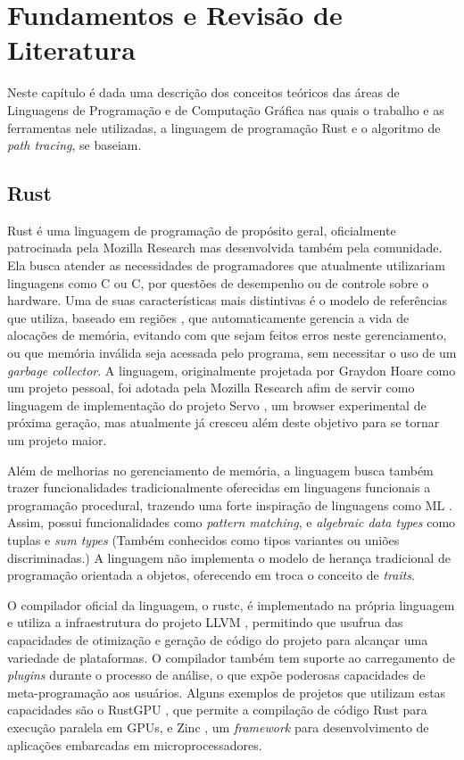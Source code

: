 \documentclass[tg]{mdtufsm}
\def\Cpp{{C\nolinebreak[4]\raisebox{.20ex}{\small\bf++}}}
\begin{document}
\chapter{Fundamentos e Revisão de Literatura}

Neste capítulo é dada uma descrição dos conceitos teóricos das áreas de Linguagens de Programação e de Computação Gráfica nas quais o trabalho e as ferramentas nele utilizadas, a linguagem de programação Rust e o algoritmo de \emph{path tracing}, se baseiam.

\section{Rust}

Rust \citep{rust} é uma linguagem de programação de propósito geral, oficialmente patrocinada pela
Mozilla Research mas desenvolvida também pela comunidade. Ela busca atender as necessidades
de programadores que atualmente utilizariam linguagens como C ou
\Cpp, por questões de desempenho ou de controle sobre o hardware. Uma de suas características mais
distintivas é o modelo de referências que utiliza, baseado em regiões \citep{grossman2002}, que
automaticamente gerencia a vida de alocações de memória, evitando com que sejam feitos erros neste
gerenciamento, ou que memória inválida seja acessada pelo programa, sem necessitar o uso de um
\emph{garbage collector}. A linguagem, originalmente projetada por Graydon Hoare como um projeto
pessoal, foi adotada pela Mozilla Research afim de servir como linguagem de
implementação do projeto Servo \citep{servo}, um browser experimental de próxima geração, mas
atualmente já cresceu além deste objetivo para se tornar um projeto maior.

Além de melhorias no gerenciamento de memória, a linguagem busca também trazer funcionalidades
tradicionalmente oferecidas em linguagens funcionais a programação procedural, trazendo uma forte inspiração de linguagens
como ML \citep{milner1997}. Assim, possui funcionalidades como \emph{pattern matching}, e \emph{algebraic data types} como tuplas e \emph{sum types} (Também conhecidos como tipos variantes ou uniões discriminadas.) A linguagem não implementa o modelo de herança tradicional de programação orientada a objetos,
oferecendo em troca o conceito de \emph{traits}.

O compilador oficial da linguagem, o rustc, é implementado na própria linguagem e utiliza a
infraestrutura do projeto LLVM \citep{lattner2004}, permitindo que usufrua das capacidades de
otimização e geração de código do projeto para alcançar uma variedade de plataformas. O compilador
também tem suporte ao carregamento de \emph{plugins} durante o processo de análise, o que expõe
poderosas capacidades de meta-programação aos usuários. Alguns exemplos de projetos que utilizam
estas capacidades são o RustGPU \citep{holk2013}, que permite a compilação de código Rust para
execução paralela em GPUs, e Zinc \citep{zinc}, um \emph{framework} para desenvolvimento de
aplicações embarcadas em microprocessadores.
\end{document}
